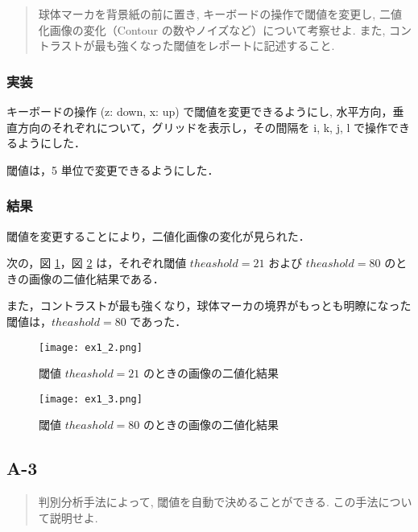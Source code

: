 \documentclass[fleqn, a4paper. 12pt]{jsarticle}
\begin{document}
      \begin{quote}
        球体マーカを背景紙の前に置き, キーボードの操作で閾値を変更し, 二値化画像の変化（Contour の数やノイズなど）について考察せよ. また, コントラストが最も強くなった閾値をレポートに記述すること.
      \end{quote}

      \subsubsection*{実装}

        キーボードの操作 (z: down, x: up) で閾値を変更できるようにし, 水平方向，垂直方向のそれぞれについて，グリッドを表示し，その間隔を i, k, j, l で操作できるようにした．

        閾値は，5 単位で変更できるようにした．
      
      \subsubsection*{結果}

        閾値を変更することにより，二値化画像の変化が見られた．

        次の，図 \ref{fig:s2}，図 \ref{fig:s3} は，それぞれ閾値 $theashold = 21$ および $theashold = 80$ のときの画像の二値化結果である．

        また，コントラストが最も強くなり，球体マーカの境界がもっとも明瞭になった閾値は，$theashold = 80$ であった．
    
        \begin{figure}[!h]
          \centering
          \texttt{[image: ex1\_2.png]}
          \caption{閾値 $theashold = 21$ のときの画像の二値化結果}
          \label{fig:s2}
        \end{figure}
  
        \begin{figure}[!h]
          \centering
          \texttt{[image: ex1\_3.png]}
          \caption{閾値 $theashold = 80$ のときの画像の二値化結果}
          \label{fig:s3}
        \end{figure}

    \subsection*{A-3}

      \begin{quote}
        判別分析手法によって, 閾値を自動で決めることができる. この手法について説明せよ.
      \end{quote}
\end{document}
